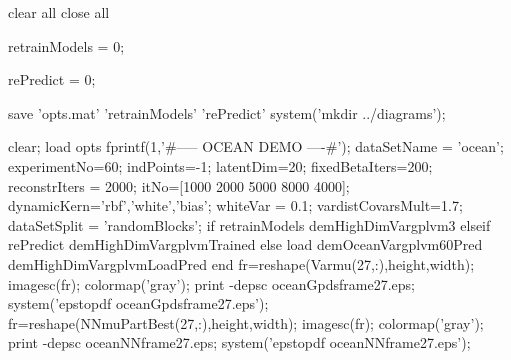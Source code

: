 \begin{matlab}


clear all
close all

retrainModels = 0;

rePredict = 0;


save 'opts.mat' 'retrainModels' 'rePredict'
system('mkdir ../diagrams');

clear; load opts
fprintf(1,'\n\n#-----  OCEAN DEMO ----#\n');
dataSetName = 'ocean';
experimentNo=60;
indPoints=-1; latentDim=20;
fixedBetaIters=200; reconstrIters = 2000;
itNo=[1000 2000 5000 8000 4000];
dynamicKern={'rbf','white','bias'};
whiteVar = 0.1;  vardistCovarsMult=1.7;
dataSetSplit = 'randomBlocks';
if retrainModels
    demHighDimVargplvm3
elseif rePredict
    demHighDimVargplvmTrained
else
    load demOceanVargplvm60Pred
    demHighDimVargplvmLoadPred
end
fr=reshape(Varmu(27,:),height,width); imagesc(fr); colormap('gray'); %
print -depsc oceanGpdsframe27.eps; system('epstopdf oceanGpdsframe27.eps');
fr=reshape(NNmuPartBest(27,:),height,width); imagesc(fr); colormap('gray'); %
print -depsc oceanNNframe27.eps; system('epstopdf oceanNNframe27.eps');


\end{matlab}
